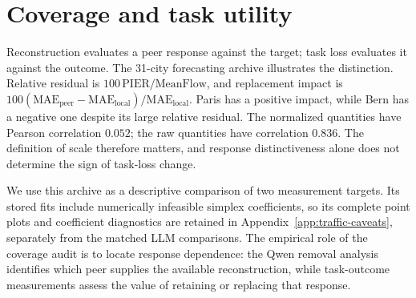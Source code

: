 \section{Coverage and task utility}
\label{sec:traffic}

Reconstruction evaluates a peer response against the target; task loss evaluates it against the outcome. The 31-city forecasting archive \citep{loder2019utd19} illustrates the distinction. Relative residual is $100\,\mathrm{PIER}/\mathrm{MeanFlow}$, and replacement impact is $100(\mathrm{MAE}_{\mathrm{peer}}-\mathrm{MAE}_{\mathrm{local}})/\mathrm{MAE}_{\mathrm{local}}$. Paris has a positive impact, while Bern has a negative one despite its large relative residual. The normalized quantities have Pearson correlation $0.052$; the raw quantities have correlation $0.836$. The definition of scale therefore matters, and response distinctiveness alone does not determine the sign of task-loss change.

We use this archive as a descriptive comparison of two measurement targets. Its stored fits include numerically infeasible simplex coefficients, so its complete point plots and coefficient diagnostics are retained in Appendix~\ref{app:traffic-caveats}, separately from the matched LLM comparisons. The empirical role of the coverage audit is to locate response dependence: the Qwen removal analysis identifies which peer supplies the available reconstruction, while task-outcome measurements assess the value of retaining or replacing that response.
